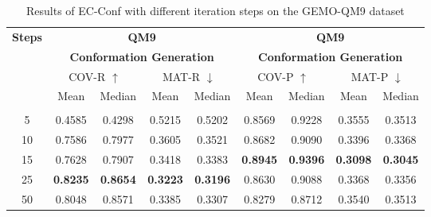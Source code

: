 \documentclass{article} %
\begin{document}
\begin{table}[htbp]
	\centering
	\scriptsize
	\caption{Results of EC-Conf with different iteration steps on the GEMO-QM9 dataset}
	\begin{tabular}{c|cccc|cccc}
		\toprule
		\multirow{5}[6]{*}{\textbf{Steps}} & \multicolumn{4}{c|}{\textbf{QM9}} & \multicolumn{4}{c}{\textbf{QM9}} \\
		\cmidrule{2-9}          & \multicolumn{4}{c|}{\textbf{Conformation Generation}} & \multicolumn{4}{c}{\textbf{Conformation Generation}} \\
		\cmidrule{2-9}          & \multicolumn{2}{c}{COV-R $\uparrow$} & \multicolumn{2}{c|}{MAT-R $\downarrow$} & \multicolumn{2}{c}{COV-P  $\uparrow$} & \multicolumn{2}{c}{MAT-P $\downarrow$} \\
		& Mean  & Median & Mean  & Median & Mean  & Median & Mean  & Median \\
		&       &       &       &       &       &       &       &  \\
		\midrule
		5     & 0.4585  & 0.4298  & 0.5215  & 0.5202  & 0.8569  & 0.9228  & 0.3555  & 0.3513  \\
		10    & 0.7586  & 0.7977  & 0.3605  & 0.3521  & 0.8682  & 0.9090  & 0.3396  & 0.3368  \\
		15    & 0.7628  & 0.7907  & 0.3418  & 0.3383  & \textbf{0.8945 } & \textbf{0.9396 } & \textbf{0.3098 } & \textbf{0.3045 } \\
		25    & \textbf{0.8235 } & \textbf{0.8654 } & \textbf{0.3223 } & \textbf{0.3196 } & 0.8630  & 0.9088  & 0.3368  & 0.3356  \\
		50    & 0.8048  & 0.8571  & 0.3385  & 0.3307  & 0.8279  & 0.8712  & 0.3540  & 0.3513  \\
		\bottomrule
	\end{tabular}%
	\label{tab1}%
\end{table}%
\end{document}
